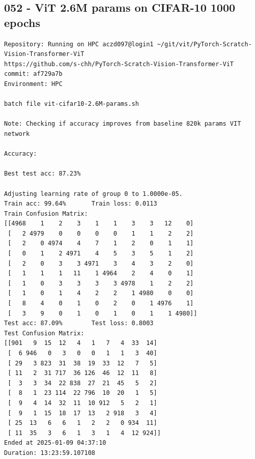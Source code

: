 \subsection{052 - ViT 2.6M params on CIFAR-10 1000 epochs}
\label{app_res:052}
\begin{verbatim}
Repository: Running on HPC aczd097@login1 ~/git/vit/PyTorch-Scratch-Vision-Transformer-ViT
https://github.com/s-chh/PyTorch-Scratch-Vision-Transformer-ViT
commit: af729a7b
Environment: HPC

batch file vit-cifar10-2.6M-params.sh

Note: Checking if accuracy improves from baseline 820k params VIT network

Accuracy: 

Best test acc: 87.23%

Adjusting learning rate of group 0 to 1.0000e-05.
Train acc: 99.64%       Train loss: 0.0113
Train Confusion Matrix:
[[4968    1    2    3    1    1    3    3   12    0]
 [   2 4979    0    0    0    0    1    1    2    2]
 [   2    0 4974    4    7    1    2    0    1    1]
 [   0    1    2 4971    4    5    3    5    1    2]
 [   2    0    3    3 4971    3    4    3    2    0]
 [   1    1    1   11    1 4964    2    4    0    1]
 [   1    0    3    3    3    3 4978    1    2    2]
 [   1    0    1    4    2    2    1 4980    0    0]
 [   8    4    0    1    0    2    0    1 4976    1]
 [   3    9    0    1    0    1    0    1    1 4980]]
Test acc: 87.09%        Test loss: 0.8003
Test Confusion Matrix:
[[901   9  15  12   4   1   7   4  33  14]
 [  6 946   0   3   0   0   1   1   3  40]
 [ 29   3 823  31  38  19  33  12   7   5]
 [ 11   2  31 717  36 126  46  12  11   8]
 [  3   3  34  22 838  27  21  45   5   2]
 [  8   1  23 114  22 796  10  20   1   5]
 [  9   4  14  32  11  10 912   5   2   1]
 [  9   1  15  18  17  13   2 918   3   4]
 [ 25  13   6   6   1   2   2   0 934  11]
 [ 11  35   3   6   1   3   1   4  12 924]]
Ended at 2025-01-09 04:37:10
Duration: 13:23:59.107108

\end{verbatim}


